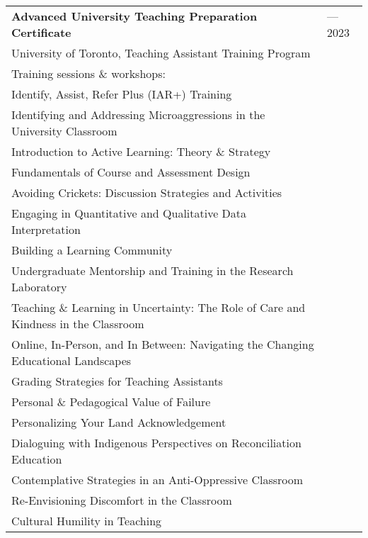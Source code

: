 \documentclass[letterpaper,11pt,oneside]{article}
\begin{document}
\def\arraystretch{1.1}
\noindent \begin{longtable}{@{} >{\raggedright\arraybackslash}p{15.5cm} >{\raggedright\arraybackslash}p{1.7cm}}

 \textbf{Advanced University Teaching Preparation Certificate}  & 2021---2023\\
University of Toronto, Teaching Assistant Training Program \\
Training sessions \& workshops: & \\
  \hspace{5mm} Identify, Assist, Refer Plus (IAR+) Training & \\
  \hspace{5mm} Identifying and Addressing Microaggressions in the University Classroom & \\
  \hspace{5mm} Introduction to Active Learning: Theory \& Strategy & \\
  \hspace{5mm} Fundamentals of Course and Assessment Design & \\
  \hspace{5mm} Avoiding Crickets: Discussion Strategies and Activities & \\
  \hspace{5mm} Engaging in Quantitative and Qualitative Data Interpretation & \\
  \hspace{5mm} Building a Learning Community & \\
  \hspace{5mm} Undergraduate Mentorship and Training in the Research Laboratory & \\
  \hspace{5mm} Teaching \& Learning in Uncertainty: The Role of Care and Kindness in the Classroom & \\
  \hspace{5mm} Online, In-Person, and In Between: Navigating the Changing Educational Landscapes & \\
  \hspace{5mm} Grading Strategies for Teaching Assistants & \\
  \hspace{5mm} Personal \& Pedagogical Value of Failure & \\
  \hspace{5mm} Personalizing Your Land Acknowledgement & \\
  \hspace{5mm} Dialoguing with Indigenous Perspectives on Reconciliation Education & \\
  \hspace{5mm} Contemplative Strategies in an Anti-Oppressive Classroom & \\
  \hspace{5mm} Re-Envisioning Discomfort in the Classroom & \\
  \hspace{5mm} Cultural Humility in Teaching & \\
\end{longtable}
\end{document}
